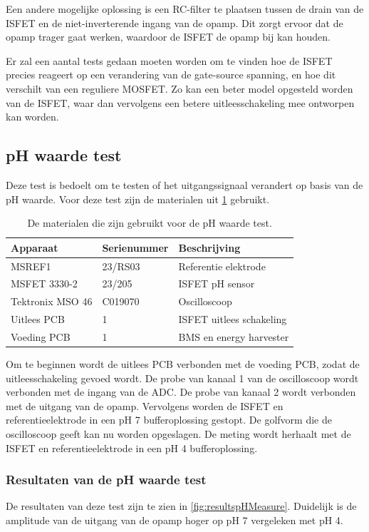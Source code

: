 Een andere mogelijke oplossing is een RC-filter te plaatsen tussen de drain van de ISFET en de niet-inverterende ingang van de opamp. Dit zorgt ervoor dat de opamp trager gaat werken, waardoor de ISFET de opamp bij kan houden.

Er zal een aantal tests gedaan moeten worden om te vinden hoe de ISFET precies reageert op een verandering van de gate-source spanning, en hoe dit verschilt van een reguliere MOSFET. Zo kan een beter model opgesteld worden van de ISFET, waar dan vervolgens een betere uitleesschakeling mee ontworpen kan worden.


\subsection{pH waarde test}
Deze test is bedoelt om te testen of het uitgangssignaal verandert op basis van de pH waarde. Voor deze test zijn de materialen uit \cref{tab:testMaterialen2} gebruikt.
\begin{table}[!htbp]
    \centering
    \begin{tabular}{l|l|l}
        Apparaat         & Serienummer & Beschrijving \\
        \hline
        MSREF1           & 23/RS03     & Referentie elektrode       \\
        MSFET 3330-2     & 23/205      & ISFET pH sensor            \\
        Tektronix MSO 46 & C019070     & Oscilloscoop               \\
        Uitlees PCB      & 1           & ISFET uitlees schakeling   \\
        Voeding PCB      & 1           & BMS en energy harvester    \\
        \hline
    \end{tabular}
    \caption{De materialen die zijn gebruikt voor de pH waarde test.}
    \label{tab:testMaterialen2}
\end{table}

Om te beginnen wordt de uitlees PCB verbonden met de voeding PCB, zodat de uitleesschakeling gevoed wordt. De probe van kanaal 1 van de oscilloscoop wordt verbonden met de ingang van de ADC. De probe van kanaal 2 wordt verbonden met de uitgang van de opamp. Vervolgens worden de ISFET en referentieelektrode in een pH 7 bufferoplossing gestopt. De golfvorm die de oscilloscoop geeft kan nu worden opgeslagen. De meting wordt herhaalt met de ISFET en referentieelektrode in een pH 4 bufferoplossing.

\subsubsection{Resultaten van de pH waarde test}
De resultaten van deze test zijn te zien in \cref{fig:resultspHMeasure}. Duidelijk is de amplitude van de uitgang van de opamp hoger op pH 7 vergeleken met pH 4.


